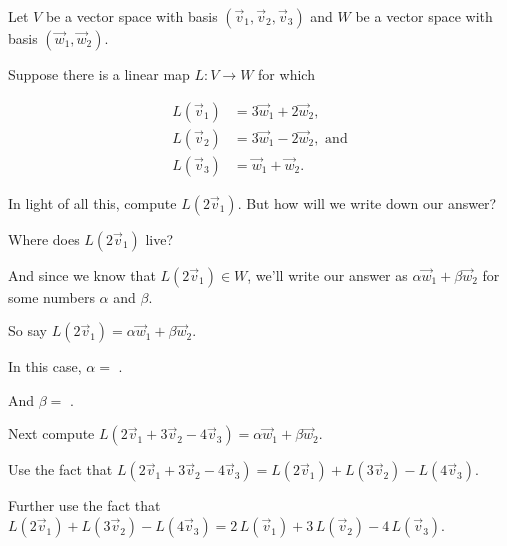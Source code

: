 \documentclass{ximera}
\begin{document}
\begin{question}
  Let $V$ be a vector space with basis $(\vec{v}_1,\vec{v}_2,\vec{v}_3)$ and $W$ be a vector space with basis $(\vec{w}_1,\vec{w}_2)$.

  Suppose there is a linear map $L: V \to W$ for which
  
  \begin{align*}
    L(\vec{v}_1) &= 3\vec{w}_1 + 2\vec{w}_2, \\ 
    L(\vec{v}_2) &= 3\vec{w}_1 - 2\vec{w}_2, \text{ and} \\
    L(\vec{v}_3) &= \vec{w}_1 + \vec{w}_2.
  \end{align*}
  
  In light of all this, compute $L(2\vec{v}_1)$.  But how will we write down our answer?

  Where does $L(2\vec{v}_1)$ live?

  \begin{solution}
    \begin{multiple-choice}
    \end{multiple-choice}
  \end{solution}

    And since we know that $L(2\vec{v}_1) \in W$, we'll write our
    answer as $\alpha \vec{w}_1 + \beta \vec{w}_2$ for some numbers
    $\alpha$ and $\beta$.

    So say $L(2\vec{v}_1) = \alpha \vec{w}_1 + \beta \vec{w}_2$.  

    \begin{solution}
      In this case, $\alpha = $ .
    \end{solution}

    \begin{solution}
      And $\beta = $ .
    \end{solution}

    Next compute $L(2\vec{v}_1+3\vec{v}_2-4\vec{v}_3) = \alpha \vec{w}_1 + \beta \vec{w}_2$.
    \begin{solution}
      \begin{hint}
        Use the fact that $L(2\vec{v}_1+3\vec{v}_2-4\vec{v}_3) = L(2\vec{v}_1)+L(3\vec{v}_2)-L(4\vec{v}_3)$.
      \end{hint}

      \begin{hint}
        Further use the fact that $L(2\vec{v}_1)+L(3\vec{v}_2)-L(4\vec{v}_3) = 2 \, L(\vec{v}_1)+3\,L(\vec{v}_2)-4\,L(\vec{v}_3)$.
      \end{hint}


\end{solution}
\end{question}
\end{document}
